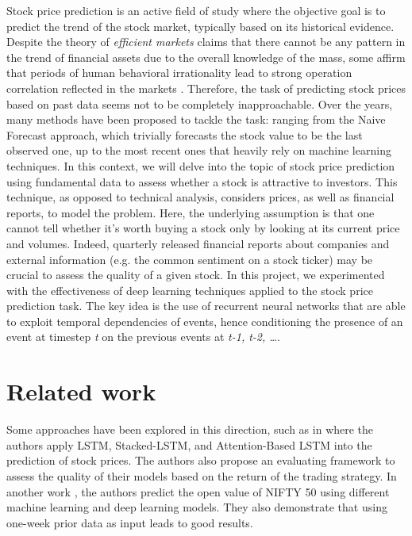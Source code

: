 \documentclass{article}
\begin{document}
Stock price prediction is an active field of study where the objective goal is to predict
the trend of the stock market, typically based on its historical evidence. Despite the
theory of \emph{efficient markets} claims that there cannot be any pattern in the trend
of financial assets due to the overall knowledge of the mass, some affirm that periods
of human behavioral irrationality lead to strong operation correlation reflected in the
markets \cite{adaptive_markets}. Therefore, the task of predicting stock prices based
on past data seems not to be completely inapproachable. Over the years,
many methods have been proposed to tackle the task: ranging from the Naive Forecast approach, which trivially forecasts the stock value to be the last observed one, up to the most recent ones that heavily rely on machine learning techniques. In this context, we will delve into the topic of stock price prediction using fundamental data to assess whether a stock is attractive to investors. 
This technique, as opposed to technical analysis, considers prices, as well as financial reports, to model the problem. Here, the underlying assumption is that one cannot tell whether it's worth buying a stock only by looking at its current price and volumes. Indeed, quarterly released financial reports about companies and external information (e.g. the common sentiment on a stock ticker) may be crucial to assess the quality of a given stock. In this project, we experimented with the effectiveness of deep learning techniques applied to the stock price prediction task. The key idea is the use of recurrent neural networks that are able to exploit temporal dependencies of events, hence conditioning the presence of an event at timestep \emph{t} on the previous events at \emph{t-1, t-2, \ldots}. 

\section{Related work}

Some approaches have been explored in this direction, such as in \cite{32066186} where the authors apply LSTM, Stacked-LSTM, and Attention-Based LSTM into the prediction of stock prices. The authors also propose an evaluating framework to assess the quality of their models based on the return of the trading strategy. In another work \cite{mehtab2020stock}, the authors predict the open value of NIFTY 50 using different machine learning and deep learning models. They also demonstrate that using one-week prior data as input leads to good results.
\end{document}
